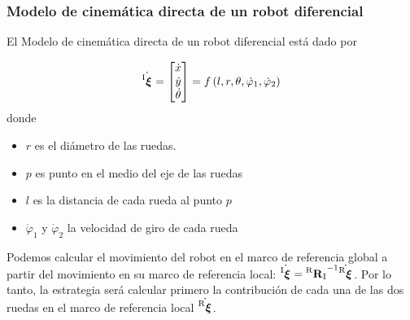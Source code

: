\begin{frame}
    \frametitle{Modelo de cinemática directa de un robot diferencial}
    \scriptsize
    \begin{figure}[!h]
        \centering
    \end{figure}
    
   El Modelo de cinemática directa de un robot diferencial está dado por

    \begin{equation*}
        \dot{\prescript{\mathrm{I}}{}{{\boldsymbol{\mathbf{\xi}}}_\mathrm{}}} =
        \begin{bmatrix}
            \dot{x}\\
            \dot{y}\\
            \dot{\theta}
        \end{bmatrix} =
        f\left( l,r,\theta,\dot{\varphi}_{1},\dot{\varphi}_{2}\right)
    \end{equation*}
    donde
    \begin{itemize}
        \item $r$ es el diámetro de las ruedas.
        \item $p$ es punto en el medio del eje de las ruedas
        \item $l$ es la distancia de cada rueda al punto $p$
        \item $\dot{\varphi}_{1}$ y $\dot{\varphi}_{2}$ la velocidad de giro de cada rueda
    \end{itemize}

    Podemos calcular el movimiento del robot en el marco de referencia global a partir del movimiento en su marco de referencia local:  $\dot{\prescript{\mathrm{I}}{}{{\boldsymbol{\mathbf{\xi}}}_\mathrm{}}} = {\prescript{\mathrm{R}}{}{{\boldsymbol{\mathbf{R}}}_\mathrm{I}}}^{-1}\dot{\prescript{\mathrm{R}}{}{{\boldsymbol{\mathbf{\xi}}}_\mathrm{}}}$. Por lo tanto, la estrategia será calcular primero la contribución de cada una de las dos ruedas en el marco de referencia local $\dot{\prescript{\mathrm{R}}{}{{\boldsymbol{\mathbf{\xi}}}_\mathrm{}}}$.
\end{frame}

